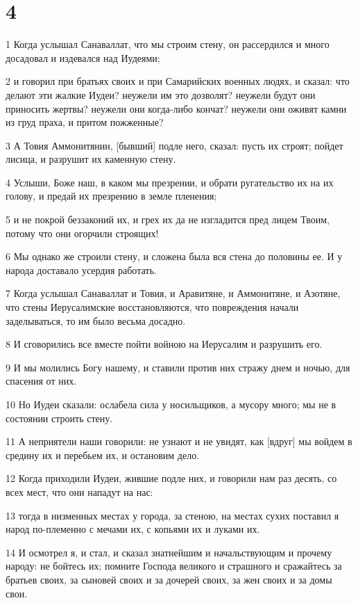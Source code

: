 \chapter{4}

\par 1 Когда услышал Санаваллат, что мы строим стену, он рассердился и много досадовал и издевался над Иудеями;
\par 2 и говорил при братьях своих и при Самарийских военных людях, и сказал: что делают эти жалкие Иудеи? неужели им это дозволят? неужели будут они приносить жертвы? неужели они когда-либо кончат? неужели они оживят камни из груд праха, и притом пожженные?
\par 3 А Товия Аммонитянин, [бывший] подле него, сказал: пусть их строят; пойдет лисица, и разрушит их каменную стену.
\par 4 Услыши, Боже наш, в каком мы презрении, и обрати ругательство их на их голову, и предай их презрению в земле пленения;
\par 5 и не покрой беззаконий их, и грех их да не изгладится пред лицем Твоим, потому что они огорчили строящих!
\par 6 Мы однако же строили стену, и сложена была вся стена до половины ее. И у народа доставало усердия работать.
\par 7 Когда услышал Санаваллат и Товия, и Аравитяне, и Аммонитяне, и Азотяне, что стены Иерусалимские восстановляются, что повреждения начали заделываться, то им было весьма досадно.
\par 8 И сговорились все вместе пойти войною на Иерусалим и разрушить его.
\par 9 И мы молились Богу нашему, и ставили против них стражу днем и ночью, для спасения от них.
\par 10 Но Иудеи сказали: ослабела сила у носильщиков, а мусору много; мы не в состоянии строить стену.
\par 11 А неприятели наши говорили: не узнают и не увидят, как [вдруг] мы войдем в средину их и перебьем их, и остановим дело.
\par 12 Когда приходили Иудеи, жившие подле них, и говорили нам раз десять, со всех мест, что они нападут на нас:
\par 13 тогда в низменных местах у города, за стеною, на местах сухих поставил я народ по-племенно с мечами их, с копьями их и луками их.
\par 14 И осмотрел я, и стал, и сказал знатнейшим и начальствующим и прочему народу: не бойтесь их; помните Господа великого и страшного и сражайтесь за братьев своих, за сыновей своих и за дочерей своих, за жен своих и за домы свои.
